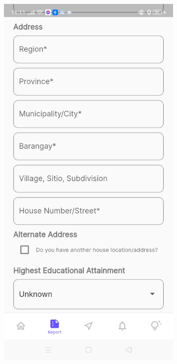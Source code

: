 \begin{figure}[!h]
\begin{subfigure}[c]{0.30\linewidth}
        \centering
        \includegraphics[scale=0.15]{figures/Chapter4/Main/p2-2.jpg}
    \end{subfigure}
    \centering
    \begin{subfigure}[c]{0.30\linewidth}

\end{subfigure}
\end{figure}
